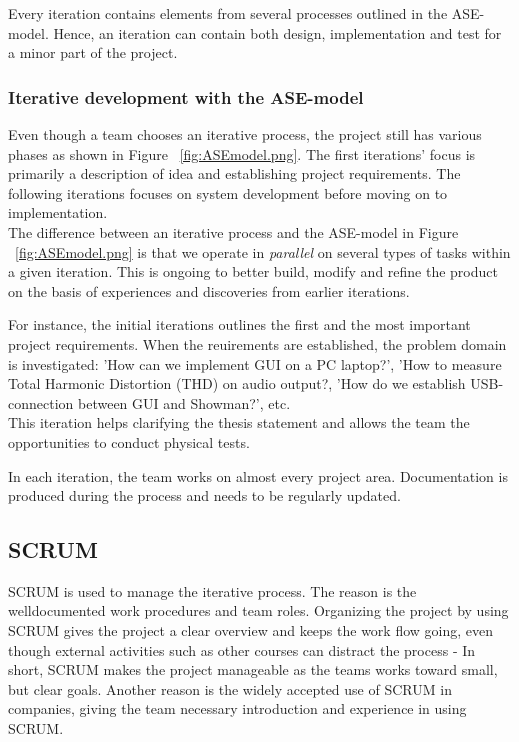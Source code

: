 Every iteration contains elements from several processes outlined in the ASE-model. Hence, an iteration can contain both design, implementation and test for a minor part of the project. \\

\subsubsection{Iterative development with the ASE-model}
Even though a team chooses an iterative process, the project still has various phases as shown in Figure ~\ref{fig:ASEmodel.png}. The first iterations' focus is primarily a description of idea and establishing project requirements. The following iterations focuses on system development before moving on to implementation. \\
The difference between an iterative process and the ASE-model in Figure ~\ref{fig:ASEmodel.png} is that we operate in \textit{parallel} on several types of tasks within a given iteration. This is ongoing to better build, modify and refine the product on the basis of experiences and discoveries from earlier iterations. \newline

For instance, the initial iterations outlines the first and the most important project requirements. When the reuirements are established, the problem domain is investigated: 'How can we implement GUI on a PC laptop?', 'How to measure Total Harmonic Distortion (THD) on audio output?, 'How do we establish USB-connection between GUI and Showman?', etc. \\
This iteration helps clarifying the thesis statement and allows the team the opportunities to conduct physical tests. \newline

In each iteration, the team works on almost every project area. Documentation is produced during the process and needs to be regularly updated. \\ 

\subsection{SCRUM}
SCRUM is used to manage the iterative process. The reason is the welldocumented work procedures and team roles. Organizing the project by using SCRUM gives the project a clear overview and keeps the work flow going, even though external activities such as other courses can distract the process - In short, SCRUM makes the project manageable as the teams works toward small, but clear goals. Another reason is the widely accepted use of SCRUM in companies, giving the team necessary introduction and experience in using SCRUM. \newline

